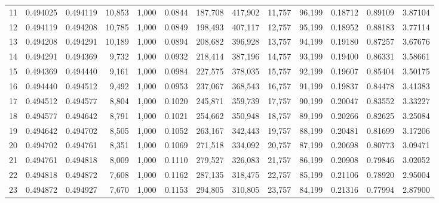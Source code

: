 \begin{tabular}{rrrrrrrrrrrrr}
11  &  0.494025 &  0.494119 &  10,853 &  1,000 &                                     0.0844 &  187,708 &  417,902 &   11,757 &   96,199 &  0.18712 &  0.89109 &  3.87104 \\
12  &  0.494119 &  0.494208 &  10,785 &  1,000 &                                     0.0849 &  198,493 &  407,117 &   12,757 &   95,199 &  0.18952 &  0.88183 &  3.77114 \\
13  &  0.494208 &  0.494291 &  10,189 &  1,000 &                                     0.0894 &  208,682 &  396,928 &   13,757 &   94,199 &  0.19180 &  0.87257 &  3.67676 \\
14  &  0.494291 &  0.494369 &   9,732 &  1,000 &                                     0.0932 &  218,414 &  387,196 &   14,757 &   93,199 &  0.19400 &  0.86331 &  3.58661 \\
15  &  0.494369 &  0.494440 &   9,161 &  1,000 &                                     0.0984 &  227,575 &  378,035 &   15,757 &   92,199 &  0.19607 &  0.85404 &  3.50175 \\
16  &  0.494440 &  0.494512 &   9,492 &  1,000 &                                     0.0953 &  237,067 &  368,543 &   16,757 &   91,199 &  0.19837 &  0.84478 &  3.41383 \\
17  &  0.494512 &  0.494577 &   8,804 &  1,000 &                                     0.1020 &  245,871 &  359,739 &   17,757 &   90,199 &  0.20047 &  0.83552 &  3.33227 \\
18  &  0.494577 &  0.494642 &   8,791 &  1,000 &                                     0.1021 &  254,662 &  350,948 &   18,757 &   89,199 &  0.20266 &  0.82625 &  3.25084 \\
19  &  0.494642 &  0.494702 &   8,505 &  1,000 &                                     0.1052 &  263,167 &  342,443 &   19,757 &   88,199 &  0.20481 &  0.81699 &  3.17206 \\
20  &  0.494702 &  0.494761 &   8,351 &  1,000 &                                     0.1069 &  271,518 &  334,092 &   20,757 &   87,199 &  0.20698 &  0.80773 &  3.09471 \\
21  &  0.494761 &  0.494818 &   8,009 &  1,000 &                                     0.1110 &  279,527 &  326,083 &   21,757 &   86,199 &  0.20908 &  0.79846 &  3.02052 \\
22  &  0.494818 &  0.494872 &   7,608 &  1,000 &                                     0.1162 &  287,135 &  318,475 &   22,757 &   85,199 &  0.21106 &  0.78920 &  2.95004 \\
23  &  0.494872 &  0.494927 &   7,670 &  1,000 &                                     0.1153 &  294,805 &  310,805 &   23,757 &   84,199 &  0.21316 &  0.77994 &  2.87900 \\

\end{tabular}
